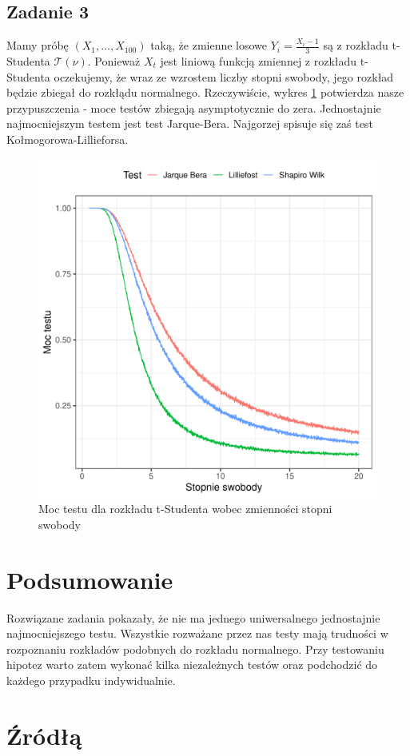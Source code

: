 \documentclass{article}
\theoremstyle{break}
\begin{document}
	\subsection*{Zadanie 3}
	Mamy próbę $(X_1,\dots,X_{100})$ taką, że zmienne losowe $Y_i = \frac{X_i - 1}{3}$
	są z rozkładu t-Studenta $\mathcal{T}(\nu)$. Ponieważ $X_t$ jest liniową funkcją zmiennej z rozkładu t-Studenta oczekujemy, że wraz ze wzrostem liczby stopni swobody, jego rozkład będzie zbiegał do rozkłądu normalnego. Rzeczywiście, wykres \ref{fig:z3} potwierdza nasze przypuszczenia - moce testów zbiegają asymptotycznie do zera. Jednostajnie najmocniejszym testem jest test Jarque-Bera. Najgorzej spisuje się zaś test Kołmogorowa-Lillieforsa.
	\begin{figure}[H]
		\begin{center}
			\includegraphics[scale=0.75]{zad3.pdf}
			\caption{Moc testu dla rozkładu t-Studenta wobec zmienności stopni swobody}
			\label{fig:z3}
		\end{center}
	\end{figure}

\section{Podsumowanie}
Rozwiązane zadania pokazały, że nie ma jednego uniwersalnego jednostajnie najmocniejszego testu. Wszystkie rozważane przez nas testy mają trudności w rozpoznaniu rozkładów podobnych do rozkładu normalnego. Przy testowaniu hipotez warto zatem wykonać kilka niezależnych testów oraz podchodzić do każdego przypadku indywidualnie.

\section{Źródłą}
\end{document}
